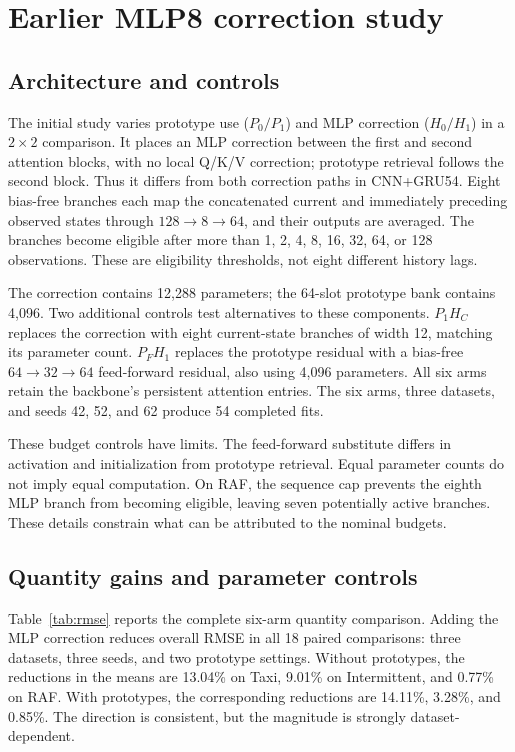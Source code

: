 \documentclass[runningheads]{llncs}
\begin{document}
\clearpage
\section{Earlier MLP8 correction study}
\label{app:metrics}
\subsection{Architecture and controls}
The initial study varies prototype use ($P_0/P_1$) and MLP correction ($H_0/H_1$) in a $2\times2$ comparison. It places an MLP correction between the first and second attention blocks, with no local Q/K/V correction; prototype retrieval follows the second block. Thus it differs from both correction paths in CNN+GRU54. Eight bias-free branches each map the concatenated current and immediately preceding observed states through $128\!\to\!8\!\to\!64$, and their outputs are averaged. The branches become eligible after more than 1, 2, 4, 8, 16, 32, 64, or 128 observations. These are eligibility thresholds, not eight different history lags.

The correction contains 12,288 parameters; the 64-slot prototype bank contains 4,096. Two additional controls test alternatives to these components. $P_1H_C$ replaces the correction with eight current-state branches of width 12, matching its parameter count. $P_FH_1$ replaces the prototype residual with a bias-free $64\!\to\!32\!\to\!64$ feed-forward residual, also using 4,096 parameters. All six arms retain the backbone's persistent attention entries. The six arms, three datasets, and seeds 42, 52, and 62 produce 54 completed fits.

These budget controls have limits. The feed-forward substitute differs in activation and initialization from prototype retrieval. Equal parameter counts do not imply equal computation. On RAF, the sequence cap prevents the eighth MLP branch from becoming eligible, leaving seven potentially active branches. These details constrain what can be attributed to the nominal budgets.


\subsection{Quantity gains and parameter controls}
Table~\ref{tab:rmse} reports the complete six-arm quantity comparison. Adding the MLP correction reduces overall RMSE in all 18 paired comparisons: three datasets, three seeds, and two prototype settings. Without prototypes, the reductions in the means are 13.04\% on Taxi, 9.01\% on Intermittent, and 0.77\% on RAF. With prototypes, the corresponding reductions are 14.11\%, 3.28\%, and 0.85\%. The direction is consistent, but the magnitude is strongly dataset-dependent.
\end{document}
